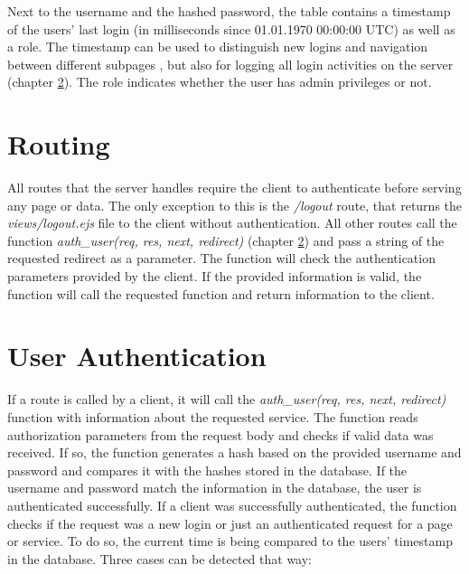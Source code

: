 Next to the username and the hashed password, the table contains a timestamp of the users' last login (in milliseconds since 01.01.1970 00:00:00 UTC) as well as a role. The timestamp can be used to distinguish new logins and navigation between different subpages , but also for logging all login activities on the server (chapter \ref{sec:user_authentication}). The role indicates whether the user has admin privileges or not.


\section{Routing}
\label{sec:routing}
All routes that the server handles require the client to authenticate before serving any page or data. The only exception to this is the \textit{/logout} route, that returns the \textit{views/logout.ejs} file to the client without authentication. All other routes call the function \textit{auth\_user(req, res, next, redirect)} (chapter \ref{sec:user_authentication}) and pass a string of the requested redirect as a parameter. The function will check the authentication parameters provided by the client. If the provided information is valid, the function will call the requested function and return information to the client.


\section{User Authentication}
\label{sec:user_authentication}
If a route is called by a client, it will call the \textit{auth\_user(req, res, next, redirect)} function with information about the requested service.  The function reads authorization parameters from the request body and checks if valid data was received. If so, the function generates a hash based on the provided username and password and compares it with the hashes stored in the database. If the username and password match the information in the database, the user is authenticated successfully.
If a client was successfully authenticated, the function checks if the request was a new login or just an authenticated request for a page or service.  To do so, the current time is being compared to the users' timestamp in the database. Three cases can be detected that way:


